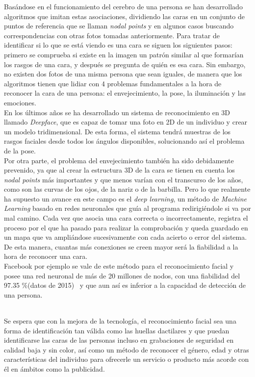 Basándose en el funcionamiento del cerebro de una persona se han desarrollado algoritmos que imitan estas asociaciones, dividiendo las caras en un conjunto de puntos de referencia que se llaman \textit{nodal points} y en algunos casos buscando correspondencias con otras fotos tomadas anteriormente. Para tratar de identificar si lo que se  está viendo es una cara se siguen los siguientes pasos: primero se comprueba si existe en la imagen un patrón similar al que formarían los rasgos de una cara, y después se pregunta de quién es esa cara. Sin embargo, no existen dos fotos de una misma persona que sean iguales, de manera que los algoritmos tienen que lidiar con 4 problemas fundamentales a la hora de reconocer la cara de una persona: el envejecimiento, la pose, la iluminación y las emociones.\\

En los últimos años se ha desarrollado un sistema de reconocimiento en 3D llamado \textit{Deepface}, que es capaz de tomar una foto en 2D de un individuo y crear un modelo tridimensional. De esta forma, el sistema tendrá muestras de los rasgos faciales desde todos los ángulos disponibles, solucionando así el problema de la pose.\\

Por otra parte, el problema del envejecimiento también ha sido debidamente prevenido, ya que al crear la estructura 3D de la cara se tienen en cuenta los \textit{nodal points} más importantes y que menos varían con el transcurso de los años, como son las curvas de los ojos, de la nariz o de la barbilla. Pero lo que realmente ha supuesto un avance en este campo es el \textit{deep learning}, un método de \textit{Machine Learning} basado en redes neuronales que guía al programa redirigiéndole si va por mal camino. Cada vez que asocia una cara correcta o incorrectamente, registra el proceso por el que ha pasado para realizar la comprobación y queda guardado en un mapa que va ampliándose sucesivamente con cada acierto o error del sistema. De esta manera, cuantas más conexiones se creen mayor será la fiabilidad a la hora de reconocer una cara.\\

Facebook por ejemplo se vale de este método para el reconocimiento facial y posee una red neuronal de más de 20 millones de nodos, con una fiabilidad del 97.35 \%(datos de 2015)~\cite{Facebook_FacialRecognition} y que aun así es inferior a la capacidad de detección de una persona.\\\

Se espera que con la mejora de la tecnología, el reconocimiento facial sea una forma de identificación tan válida como las huellas dactilares y que puedan identificarse las caras de las personas incluso en grabaciones de seguridad en calidad baja y sin color, así como un método de reconocer el género, edad y otras características del individuo para ofrecerle un servicio o producto más acorde con él en ámbitos como la publicidad.\\

